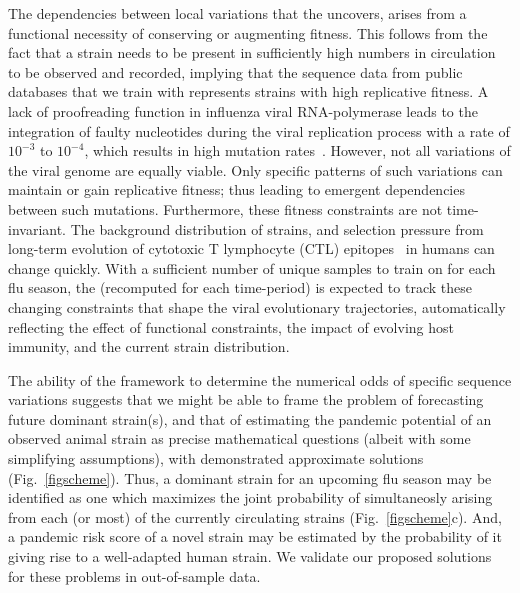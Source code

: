 \documentclass[onecolumn, compsoc,10pt]{IEEEtran}
\begin{document}
The  dependencies between local variations that the \enet uncovers, arises from a  functional necessity of conserving or augmenting  fitness. This follows from the fact that  a  strain needs  to be present in sufficiently high numbers in circulation to be  observed and recorded, implying that the sequence data from public databases that we train  with represents strains with high replicative fitness. A lack of proofreading function in influenza viral RNA-polymerase leads to the integration of faulty nucleotides during the viral replication process with a rate of $10^{-3}$ to $10^{-4}$, which results in high mutation rates~\cite{ahlquist2002rna,chen2006avian}. However, not all variations of the viral genome are equally viable. Only specific patterns of such variations can maintain or gain replicative fitness; thus leading to emergent dependencies between such mutations. Furthermore, these fitness constraints are not time-invariant. The background distribution of strains, and selection pressure from   long-term evolution of cytotoxic T lymphocyte (CTL) epitopes~\cite{woolthuis2016long,fan2012role,van2016differential,berkhoff2007assessment,van2012evasion} in humans can change quickly. With a sufficient number of unique samples to train on for each flu season, the \enet (recomputed for each time-period) is expected to  track these changing constraints that shape the viral evolutionary trajectories, automatically reflecting the effect of  functional constraints, the impact of  evolving host immunity, and the current strain distribution.  

The ability of the \enet framework to determine the numerical odds of specific sequence variations suggests that we might be able to frame the problem of forecasting future dominant strain(s), and that of estimating the  pandemic potential of an observed animal strain as precise mathematical questions (albeit with some simplifying assumptions), with demonstrated approximate solutions (Fig.~\ref{figscheme}). Thus,  a dominant strain for an upcoming flu season
may be identified as one which maximizes the joint probability of simultaneosly arising from each (or most)  of the currently circulating strains (Fig.~\ref{figscheme}c).
And, a pandemic risk score of a novel strain may be estimated by the probability of it giving rise to a well-adapted human strain.  We validate  our proposed solutions for these problems in out-of-sample data.
\end{document}
